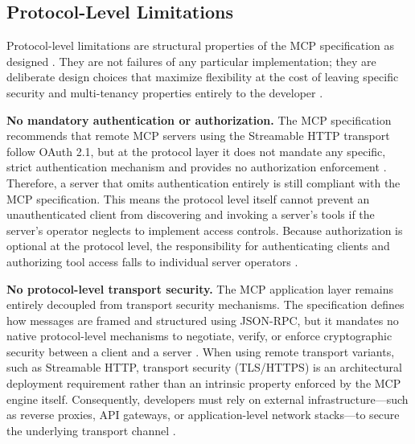 \documentclass[english, 12pt, a4paper, elec, utf8, a-2b, online]{aaltothesis}
\begin{document}
\subsection{Protocol-Level Limitations}
\label{sec:proto-limits}

Protocol-level limitations are structural properties of the MCP specification as designed \cite{mcpspec2026}.
They are not failures of any particular implementation; they are deliberate design choices that maximize
flexibility at the cost of leaving specific security and multi-tenancy properties entirely to the
developer \cite{yan2025mcpmisuse, hou2025landscape, narajala2025enterprise}.

\textbf{No mandatory authentication or authorization.}
The MCP specification recommends that remote MCP servers using the Streamable HTTP transport follow OAuth 2.1, but at the protocol layer it does not mandate any specific, strict authentication mechanism and provides no authorization enforcement \cite{mcpspec2026, mcp_authorization_2025, mcp_streamable_http}.
Therefore, a server that omits authentication entirely is still compliant with the MCP specification.
This means the protocol level itself cannot prevent an unauthenticated client from discovering and invoking
a server's tools if the server's operator neglects to implement access controls.
Because authorization is optional at the protocol level, the responsibility for authenticating clients and authorizing tool access falls to individual server operators \cite{narajala2025enterprise, owasp_mcp_security_2026}.

\textbf{No protocol-level transport security.}
The MCP application layer remains entirely decoupled from transport security mechanisms. The specification defines how messages are framed and structured using JSON-RPC, but it mandates no native protocol-level mechanisms to negotiate, verify, or enforce cryptographic security between a client and a server \cite{mcpspec2026}. When using remote transport variants, such as Streamable HTTP, transport security (TLS/HTTPS) is an architectural deployment requirement rather than an intrinsic property enforced by the MCP engine itself. 
Consequently, developers must rely on external infrastructure—such as reverse proxies, API gateways, or application-level network stacks—to secure the underlying transport channel \cite{mcp_streamable_http, owasp_mcp_security_2026}.
\end{document}
